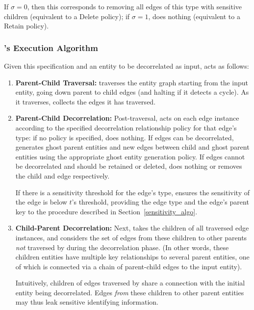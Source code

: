         If $\sigma = 0$, then this corresponds to removing all edges of this type
        with sensitive children (equivalent to a Delete policy); if $\sigma = 1$, \sys does
        nothing (equivalent to a Retain policy).

\subsubsection{\sys's Execution Algorithm}
Given this specification and an entity to be decorrelated as input, \sys acts as follows:
\begin{enumerate}
    \item \textbf{Parent-Child Traversal:} \sys traverses the entity graph starting from the input entity,
        going down parent to child edges (and halting if it detects a cycle).  As it traverses,
        \sys collects the edges it has traversed. 
    
    \item \textbf{Parent-Child Decorrelation:} Post-traversal, \sys acts on each edge instance
        according to the specified decorrelation relationship policy for that edge's type: if no
        policy is specified, \sys does nothing. If edges can be decorrelated, \sys generates
        ghost parent entities and new edges between child and ghost parent entities using the
        appropriate ghost entity generation policy. If edges cannot be decorrelated and should be
        retained or deleted, \sys does nothing or removes the child and edge respectively. 
    
        If there is a sensitivity threshold for the edge's type, \sys ensures the
        sensitivity of the edge is below $t$'s threshold, providing the edge type and the edge's
        parent key to the procedure described in Section~\ref{sensitivity_algo}. 

    \item \textbf{Child-Parent Decorrelation:} Next, \sys takes the children of all traversed edge
        instances, and considers the set of edges from these children to other parents
        \emph{not} traversed by \sys during the decorrelation phase. (In other words, these
        children entities have multiple key relationships to several parent entities, one of
        which is connected via a chain of parent-child edges to the input entity).

        Intuitively, children of edges traversed by \sys share a connection with the initial
        entity being decorrelated. Edges \emph{from} these children to other parent entities may
        thus leak sensitive identifying information. 


\end{enumerate}
